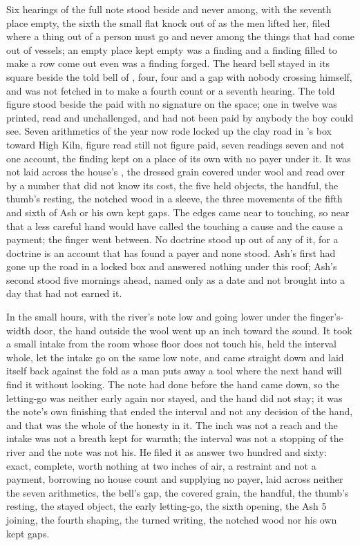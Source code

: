 Six hearings of the full note stood beside and never among, with the seventh place empty, the sixth the small flat knock out of  as the men lifted her, filed where a thing out of a person must go and never among the things that had come out of vessels; an empty place kept empty was a finding and a finding filled to make a row come out even was a finding forged. The heard bell stayed in its square beside the told bell of , four, four and a gap with nobody crossing himself, and was not fetched in to make a fourth count or a seventh hearing. The told figure stood beside the paid with no signature on the space; one in twelve was printed, read and unchallenged, and had not been paid by anybody the boy could see. Seven arithmetics of the year now rode locked up the clay road in 's box toward High Kiln, figure read still not figure paid, seven readings seven and not one account, the finding kept on a place of its own with no payer under it. It was not laid across the house's , the dressed grain covered under wool and read over by a number that did not know its cost, the five held objects, the handful, the thumb's resting, the notched wood in a sleeve, the three movements of the fifth and sixth of Ash or his own kept gaps. The edges came near to touching, so near that a less careful hand would have called the touching a cause and the cause a payment; the finger went between. No doctrine stood up out of any of it, for a doctrine is an account that has found a payer and none stood. Ash's first had gone up the road in a locked box and answered nothing under this roof; Ash's second stood five mornings ahead, named only as a date and not brought into a day that had not earned it.

In the small hours, with the river's note low and going lower under the finger's-width door, the hand outside the wool went up an inch toward the sound. It took a small intake from the room whose floor does not touch his, held the interval whole, let the intake go on the same low note, and came straight down and laid itself back against the fold as a man puts away a tool where the next hand will find it without looking. The note had done before the hand came down, so the letting-go was neither early again nor stayed, and the hand did not stay; it was the note's own finishing that ended the interval and not any decision of the hand, and that was the whole of the honesty in it. The inch was not a reach and the intake was not a breath kept for warmth; the interval was not a stopping of the river and the note was not his. He filed it as answer two hundred and sixty: exact, complete, worth nothing at two inches of air, a restraint and not a payment, borrowing no house count and supplying no payer, laid across neither the seven arithmetics, the bell's gap, the covered grain, the handful, the thumb's resting, the stayed object, the early letting-go, the sixth opening, the Ash 5 joining, the fourth shaping, the turned writing, the notched wood nor his own kept gaps.

